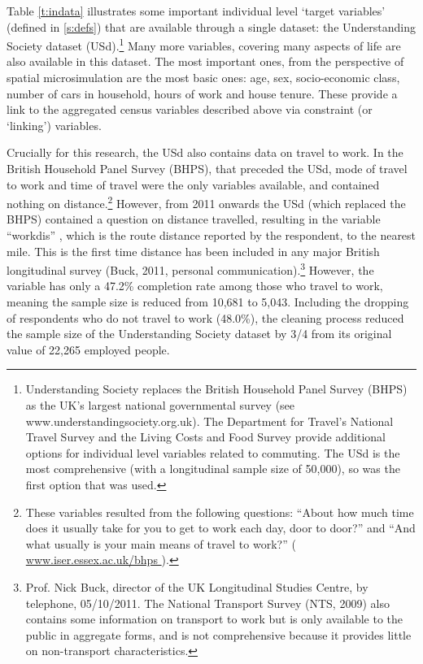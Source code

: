 \documentclass[a4paper, 11pt, twoside]{Thesis}
\begin{document}
Table \ref{t:indata} illustrates some important individual level `target
variables' (defined in \cref{s:defs}) that are available through a
single dataset: the
Understanding Society dataset 
(USd).\footnote{Understanding
Society replaces the British Household Panel
Survey (BHPS) as the UK's largest national governmental survey (see
www.understandingsociety.org.uk). The Department for Travel's National Travel
Survey and the Living Costs and Food Survey provide additional options for
individual level variables related to commuting. The USd is the most
comprehensive (with a longitudinal sample size of 50,000), so was the first
option that was used.
}
Many more variables, covering many aspects of life are also available in this
dataset. The most important ones, from the perspective of spatial
microsimulation are the most basic ones: age, sex, socio-economic class, number
of cars in household, hours of work and house tenure. These provide a link to
the aggregated census variables described above via constraint (or `linking')
variables. 

Crucially for this research, the USd also contains data on travel to work.
In the British Household Panel Survey (BHPS), that preceded the USd, mode of
travel to work and time of travel were the only variables
available, and contained nothing on distance.\footnote{These
variables resulted from the following questions: ``About how much time does it
usually take for you to get to work each
day, door to door?'' and ``And what usually is your main means of travel to
work?''
(\href{
https://www.iser.essex.ac.uk/bhps/documentation/pdf_versions/index.html}{
www.iser.essex.ac.uk/bhps }).
}
However, from 2011 onwards the USd (which replaced the BHPS) contained a
question on distance travelled, resulting in the variable ``workdis''
\citep{ESDS2011}, which is the route distance reported by the respondent, to
the nearest mile. This is the first time distance has been included in any major
British longitudinal survey (Buck, 2011, personal
communication).\footnote{Prof. Nick Buck, director of the UK Longitudinal
Studies Centre, by telephone, 05/10/2011. The National Transport Survey (NTS,
2009) also contains some information on transport to work but is only available
to the public in aggregate forms, and is not comprehensive because it
provides little on non-transport characteristics.
}
However, the
variable has only a 47.2\% completion rate among those who travel to work,
meaning the sample size is reduced from 10,681 to 5,043.
Including the dropping of respondents who do not travel to work (48.0\%), the
cleaning process reduced the sample size of the Understanding Society
dataset by 3/4 from its original value of 22,265 employed people.
\end{document}

